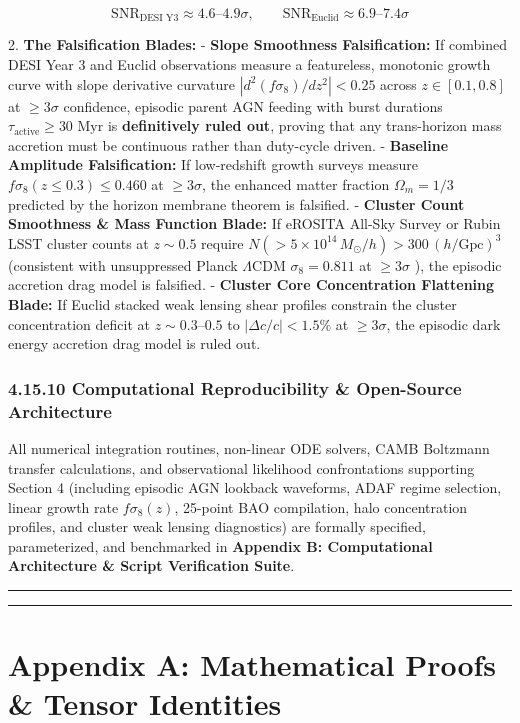 \documentclass[11pt,a4paper]{article}
\theoremstyle{definition}\newtheorem{definition}{Definition}
\theoremstyle{remark}\newtheorem{remark}{Remark}
\begin{document}
\begin{equation}
\text{SNR}_{\text{DESI Y3}} \approx 4.6\text{--}4.9\sigma, \qquad \text{SNR}_{\text{Euclid}} \approx 6.9\text{--}7.4\sigma
\end{equation}


2. \textbf{The Falsification Blades:}
- \textbf{Slope Smoothness Falsification:} If combined DESI Year 3 and Euclid observations measure a featureless, monotonic growth curve with slope derivative curvature $|d^2(f\sigma_8)/dz^2| < 0.25$ across $z \in [0.1, 0.8]$ at $\ge 3\sigma$ confidence, episodic parent AGN feeding with burst durations $\tau_{\text{active}} \ge 30\text{ Myr}$ is \textbf{definitively ruled out}, proving that any trans-horizon mass accretion must be continuous rather than duty-cycle driven.
- \textbf{Baseline Amplitude Falsification:} If low-redshift growth surveys measure $f\sigma_8(z \le 0.3) \le 0.460$ at $\ge 3\sigma$, the enhanced matter fraction $\Omega_m = 1/3$ predicted by the horizon membrane theorem is falsified.
- \textbf{Cluster Count Smoothness \& Mass Function Blade:} If eROSITA All-Sky Survey or Rubin LSST cluster counts at $z \sim 0.5$ require $N(> 5 \times 10^{14} \, M_\odot/h) > 300 \, (h/\text{Gpc})^3$ (consistent with unsuppressed Planck $\Lambda\text{CDM}$ $\sigma_8 = 0.811$ at $\ge 3\sigma$ ), the episodic accretion drag model is falsified.
- \textbf{Cluster Core Concentration Flattening Blade:} If Euclid stacked weak lensing shear profiles constrain the cluster concentration deficit at $z \sim 0.3\text{--}0.5$ to $|\Delta c / c| < 1.5\%$ at $\ge 3\sigma$, the episodic dark energy accretion drag model is ruled out.
\subsubsection{4.15.10 Computational Reproducibility \& Open-Source Architecture}

All numerical integration routines, non-linear ODE solvers, CAMB Boltzmann transfer calculations, and observational likelihood confrontations supporting Section 4 (including episodic AGN lookback waveforms, ADAF regime selection, linear growth rate $f\sigma_8(z)$, 25-point BAO compilation, halo concentration profiles, and cluster weak lensing diagnostics) are formally specified, parameterized, and benchmarked in \textbf{Appendix B: Computational Architecture \& Script Verification Suite}.

\noindent\rule{\linewidth}{0.4pt}

\noindent\rule{\linewidth}{0.4pt}
\section{Appendix A: Mathematical Proofs \& Tensor Identities}
\end{document}

